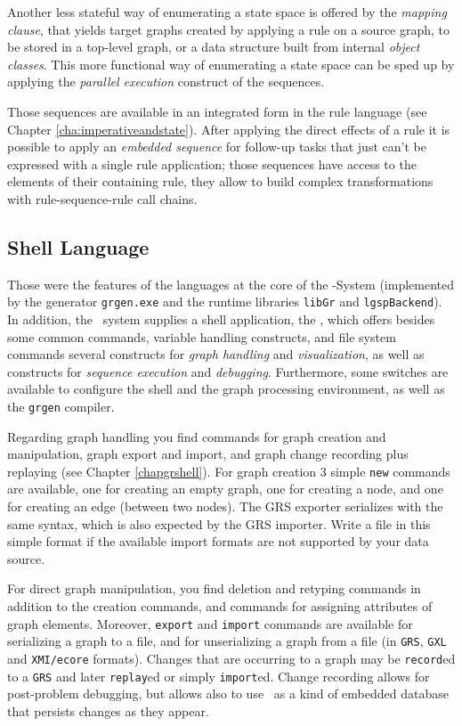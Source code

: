 Another less stateful way of enumerating a state space is offered by the \emph{mapping clause}, that yields target graphs created by applying a rule on a source graph, to be stored in a top-level graph, or a data structure built from internal \emph{object classes}.
This more functional way of enumerating a state space can be sped up by applying the \emph{parallel execution} construct of the sequences.

Those sequences are available in an integrated form in the rule language (see Chapter \ref{cha:imperativeandstate}).
After applying the direct effects of a rule it is possible to apply an \emph{embedded sequence} for follow-up tasks that just can't be expressed with a single rule application; those sequences have access to the elements of their containing rule, they allow to build complex transformations with rule-sequence-rule call chains.
		
\subsection{Shell Language}
Those were the features of the languages at the core of the \GrG-System (implemented by the generator \texttt{grgen.exe} and the runtime libraries \texttt{libGr} and \texttt{lgspBackend}).
In addition, the \GrG\ system supplies a shell application, the \GrShell,
which offers besides some common commands, variable handling constructs, and file system commands several constructs for \emph{graph handling} and \emph{visualization}, as well as constructs for \emph{sequence execution} and \emph{debugging}.
Furthermore, some switches are available to configure the shell and the graph processing environment, as well as the \texttt{grgen} compiler.

Regarding graph handling you find commands for graph creation and manipulation, graph export and import, and graph change recording plus replaying (see Chapter \ref{chapgrshell}).
For graph creation 3 simple \texttt{new} commands are available, one for creating an empty graph, one for creating a node, and one for creating an edge (between two nodes).
The GRS exporter serializes with the same syntax, which is also expected by the GRS importer.
Write a file in this simple format if the available import formats are not supported by your data source.

For direct graph manipulation, you find deletion and retyping commands in addition to the creation commands, and commands for assigning attributes of graph elements.
Moreover, \texttt{export} and \texttt{import} commands are available for serializing a graph to a file, and for unserializing a graph from a file (in \texttt{GRS}, \texttt{GXL} and \texttt{XMI/ecore} formats). 
Changes that are occurring to a graph may be \texttt{record}ed to a \texttt{GRS} and later \texttt{replay}ed or simply \texttt{import}ed.
Change recording allows for post-problem debugging, but allows also to use \GrG\ as a kind of embedded database that persists changes as they appear. %

